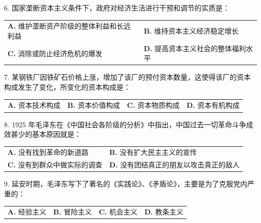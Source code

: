 \documentclass[UTF8,11pt]{ctexart}
\begin{document}
6. 国家垄断资本主义条件下，政府对经济生活进行干预和调节的实质是：


\begin{center}\begin{tabular}{>{\raggedright\arraybackslash}p{\dimexpr(\linewidth-4\tabcolsep)/2\relax}>{\raggedright\arraybackslash}p{\dimexpr(\linewidth-4\tabcolsep)/2\relax}}
\textbf{A.} 维护垄断资产阶级的整体利益和长远利益 & \textbf{B.} 维持资本主义经济稳定增长\\[.35em]
\textbf{C.} 消除或防止经济危机的爆发 & \textbf{D.} 提高资本主义社会的整体福利水平\\[.35em]\end{tabular}\end{center}

7. 某钢铁厂因铁矿石价格上涨，增加了该厂的预付资本数量，这使得该厂的资本构成发生了变化，所变化的资本构成是：


\begin{center}\begin{tabular}{>{\raggedright\arraybackslash}p{\dimexpr(\linewidth-8\tabcolsep)/4\relax}>{\raggedright\arraybackslash}p{\dimexpr(\linewidth-8\tabcolsep)/4\relax}>{\raggedright\arraybackslash}p{\dimexpr(\linewidth-8\tabcolsep)/4\relax}>{\raggedright\arraybackslash}p{\dimexpr(\linewidth-8\tabcolsep)/4\relax}}
\textbf{A.} 资本技术构成 & \textbf{B.} 资本价值构成 & \textbf{C.} 资本物质构成 & \textbf{D.} 资本有机构成\\[.35em]\end{tabular}\end{center}

8. 1925 年毛泽东在《中国社会各阶级的分析》中指出，中国过去一切革命斗争成效甚少的基本原因就是：


\begin{center}\begin{tabular}{>{\raggedright\arraybackslash}p{\dimexpr(\linewidth-4\tabcolsep)/2\relax}>{\raggedright\arraybackslash}p{\dimexpr(\linewidth-4\tabcolsep)/2\relax}}
\textbf{A.} 没有找到革命的新道路 & \textbf{B.} 没有扩大民主主义的宣传\\[.35em]
\textbf{C.} 没有到群众中做实际的调查 & \textbf{D.} 没有团结真正的朋友以攻击真正的敌人\\[.35em]\end{tabular}\end{center}

9. 延安时期，毛泽东写下了著名的《实践论》、《矛盾论》，主要是为了克服党内严重的：


\begin{center}\begin{tabular}{>{\raggedright\arraybackslash}p{\dimexpr(\linewidth-8\tabcolsep)/4\relax}>{\raggedright\arraybackslash}p{\dimexpr(\linewidth-8\tabcolsep)/4\relax}>{\raggedright\arraybackslash}p{\dimexpr(\linewidth-8\tabcolsep)/4\relax}>{\raggedright\arraybackslash}p{\dimexpr(\linewidth-8\tabcolsep)/4\relax}}
\textbf{A.} 经验主义 & \textbf{B.} 冒险主义 & \textbf{C.} 机会主义 & \textbf{D.} 教条主义\\[.35em]\end{tabular}\end{center}
\end{document}
